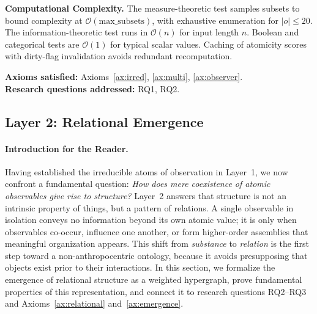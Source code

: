 \textbf{Computational Complexity.} The measure-theoretic test samples subsets to bound complexity at $\mathcal{O}(\text{max\_subsets})$, with exhaustive enumeration for $|o| \le 20$. The information-theoretic test runs in $\mathcal{O}(n)$ for input length $n$. Boolean and categorical tests are $\mathcal{O}(1)$ for typical scalar values. Caching of atomicity scores with dirty-flag invalidation avoids redundant recomputation.

\textbf{Axioms satisfied:} Axioms~\ref{ax:irred}, \ref{ax:multi}, \ref{ax:observer}. \\
\textbf{Research questions addressed:} RQ1, RQ2.

\subsection{Layer 2: Relational Emergence}
\label{subsec:layer2}

\paragraph{Introduction for the Reader.}
Having established the irreducible atoms of observation in Layer~1, we now confront a fundamental question: \emph{How does mere coexistence of atomic observables give rise to structure?} Layer~2 answers that structure is not an intrinsic property of things, but a pattern of relations. A single observable in isolation conveys no information beyond its own atomic value; it is only when observables co-occur, influence one another, or form higher-order assemblies that meaningful organization appears. This shift from \emph{substance} to \emph{relation} is the first step toward a non-anthropocentric ontology, because it avoids presupposing that objects exist prior to their interactions. In this section, we formalize the emergence of relational structure as a weighted hypergraph, prove fundamental properties of this representation, and connect it to research questions RQ2--RQ3 and Axioms~\ref{ax:relational} and~\ref{ax:emergence}.

